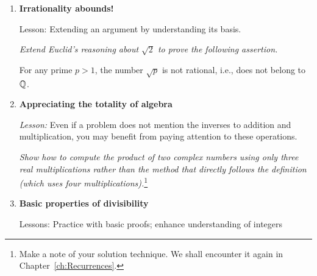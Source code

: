 \begin{enumerate}
\item
{\bf Irrationality abounds!}

{\sc Lesson:} Extending an argument by understanding its basis.

\smallskip

{\em Extend Euclid's reasoning about $\sqrt{2}$ to prove the following assertion.}


\begin{prop}
For any prime $p >1$, the number $\sqrt{p}$ is not rational, i.e., does not belong to $\mathbb{Q}$.
\end{prop}

\medskip\item
{\bf Appreciating the totality of algebra}

{\em Lesson:} Even if a problem does not mention the inverses to addition and multiplication, you may benefit from paying attention to these operations.

\smallskip


{\em Show how to compute the product of two complex numbers using only {\em three}
real multiplications rather than the method that directly follows the definition (which uses four multiplications).}\footnote{Make a note of your solution technique.  We shall encounter it again in Chapter~\ref{ch:Recurrences}.}

\bigskip

\noindent {}
\medskip

\medskip\item
{\bf Basic properties of divisibility}

{\sc Lessons:} Practice with basic proofs; enhance understanding of integers

\smallskip


\end{enumerate}
